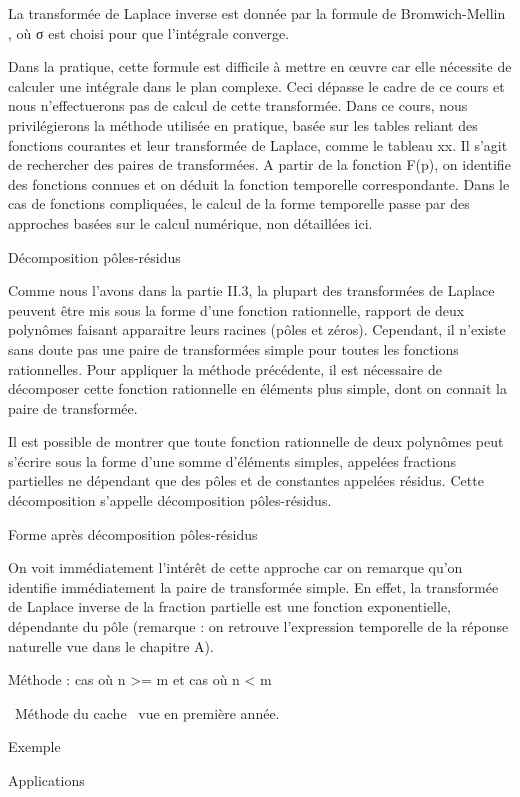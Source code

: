 \documentclass[]{article}
\begin{document}
La transformée de Laplace inverse est donnée par la formule de
Bromwich-Mellin , où σ est choisi pour que l'intégrale converge.

Dans la pratique, cette formule est difficile à mettre en œuvre car elle
nécessite de calculer une intégrale dans le plan complexe. Ceci dépasse
le cadre de ce cours et nous n'effectuerons pas de calcul de cette
transformée. Dans ce cours, nous privilégierons la méthode utilisée en
pratique, basée sur les tables reliant des fonctions courantes et leur
transformée de Laplace, comme le tableau xx. Il s'agit de rechercher des
paires de transformées. A partir de la fonction F(p), on identifie des
fonctions connues et on déduit la fonction temporelle correspondante.
Dans le cas de fonctions compliquées, le calcul de la forme temporelle
passe par des approches basées sur le calcul numérique, non détaillées
ici.~

Décomposition pôles-résidus

Comme nous l'avons dans la partie II.3, la plupart des transformées de
Laplace peuvent être mis sous la forme d'une fonction rationnelle,
rapport de deux polynômes faisant apparaitre leurs racines (pôles et
zéros). Cependant, il n'existe sans doute pas une paire de transformées
simple pour toutes les fonctions rationnelles. Pour appliquer la méthode
précédente, il est nécessaire de décomposer cette fonction rationnelle
en éléments plus simple, dont on connait la paire de transformée.

Il est possible de montrer que toute fonction rationnelle de deux
polynômes peut s'écrire sous la forme d'une somme d'éléments simples,
appelées fractions partielles ne dépendant que des pôles et de
constantes appelées résidus. Cette décomposition s'appelle décomposition
pôles-résidus.~

Forme après décomposition pôles-résidus

On voit immédiatement l'intérêt de cette approche car on remarque qu'on
identifie immédiatement la paire de transformée simple. En effet, la
transformée de Laplace inverse de la fraction partielle est une fonction
exponentielle, dépendante du pôle (remarque : on retrouve l'expression
temporelle de la réponse naturelle vue dans le chapitre A).

Méthode : cas où n \textgreater{}= m et cas où n \textless{} m

~Méthode du cache~ vue en première année.

Exemple

Applications~
\end{document}

